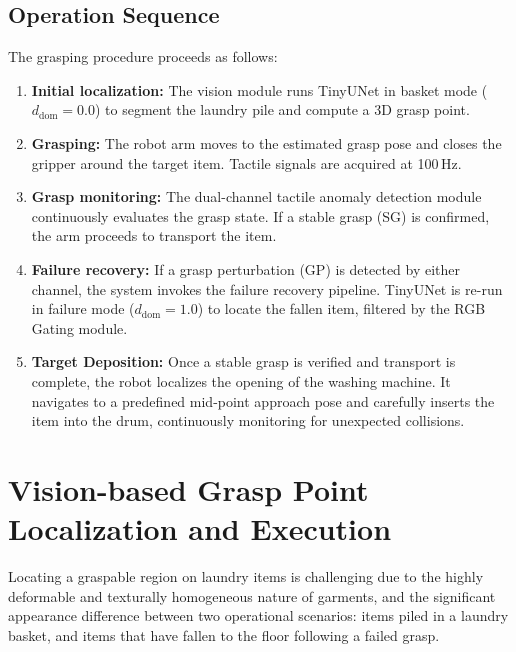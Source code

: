 \documentclass[pdflatex,sn-mathphys-num]{sn-jnl}%
\theoremstyle{thmstyleone}%
\theoremstyle{thmstyletwo}%
\theoremstyle{thmstylethree}%
\begin{document}
\subsection{Operation Sequence}\label{sec:sequence}
The grasping procedure proceeds as follows:
\begin{enumerate}
    \item \textbf{Initial localization:}
    The vision module runs TinyUNet in basket mode ($d_\text{dom} = 0.0$) to segment the laundry pile and compute a 3D grasp point.

    \item \textbf{Grasping:}
    The robot arm moves to the estimated grasp pose and closes the gripper around the target item. Tactile signals are acquired at 100\,Hz.

    \item \textbf{Grasp monitoring:}
    The dual-channel tactile anomaly detection module continuously evaluates the grasp state. If a stable grasp (SG) is confirmed, the arm proceeds to transport the item.

    \item \textbf{Failure recovery:}
    If a grasp perturbation (GP) is detected by either channel, the system invokes the failure recovery pipeline. TinyUNet is re-run in failure mode ($d_\text{dom} = 1.0$) to locate the fallen item, filtered by the RGB Gating module.

    \item \textbf{Target Deposition:}
    Once a stable grasp is verified and transport is complete, the robot localizes the opening of the washing machine. It navigates to a predefined mid-point approach pose and carefully inserts the item into the drum, continuously monitoring for unexpected collisions.
\end{enumerate}

\section{Vision-based Grasp Point Localization and Execution}\label{sec:vision}

Locating a graspable region on laundry items is challenging due to the highly deformable and texturally homogeneous nature of garments, and the significant appearance difference between two operational scenarios: items piled in a laundry basket, and items that have fallen to the floor following a failed grasp.
\end{document}
